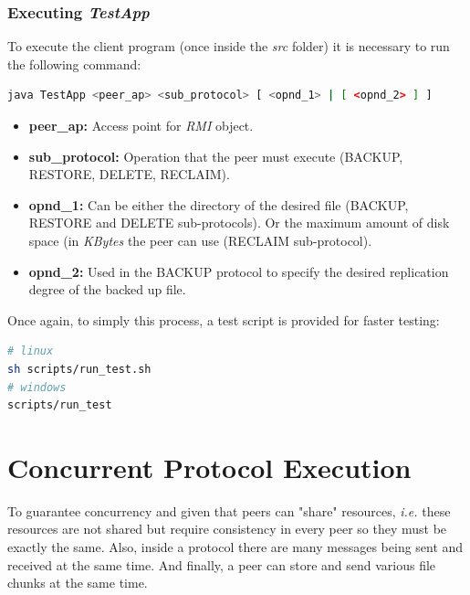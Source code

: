 \documentclass[a4paper]{article}
\begin{document}
        \subsubsection*{Executing \textit{TestApp}}
        
            To execute the client program (once inside the \textit{src} folder) it is necessary to run the following command:
            
\begin{lstlisting}[language=Bash, caption=Executing \textit{TestApp} Program]
java TestApp <peer_ap> <sub_protocol> [ <opnd_1> | [ <opnd_2> ] ]
\end{lstlisting}

            \begin{itemize}
                \item \textbf{peer\_ap:} Access point for \textit{RMI} object.
              
                \item \textbf{sub\_protocol:} Operation that the peer must execute (BACKUP, RESTORE, DELETE, RECLAIM).
                
                \item \textbf{opnd\_1:} Can be either the directory of the desired file (BACKUP, RESTORE and DELETE sub-protocols). Or the maximum amount of disk space (in \textit{KBytes} the peer can use (RECLAIM sub-protocol).
                
                \item \textbf{opnd\_2:} Used in the BACKUP protocol to specify the desired replication degree of the backed up file.
            \end{itemize}
            
            Once again, to simply this process, a test script is provided for faster testing:

\begin{lstlisting}[language=Bash, caption=Executing \textit{TestApp} Program]
# linux
sh scripts/run_test.sh
# windows
scripts/run_test
\end{lstlisting}

\section{Concurrent Protocol Execution}

    To guarantee concurrency and given that peers can "share" resources, \textit{i.e.} these resources are not shared but require consistency in every peer so they must be exactly the same. Also, inside a protocol there are many messages being sent and received at the same time. And finally, a peer can store and send various file chunks at the same time.
    \newline
    
\end{document}
